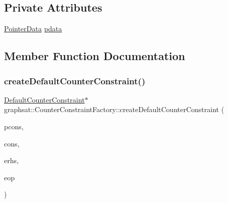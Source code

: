 \subsection*{Private Attributes}
\begin{DoxyCompactItemize}
\item 
\mbox{\hyperlink{classgraphsat_1_1_pointer_data}{Pointer\+Data}} \mbox{\hyperlink{classgraphsat_1_1_counter_constraint_factory_a228041246730a92798c374c31515e478}{pdata}}
\end{DoxyCompactItemize}


\subsection{Member Function Documentation}
\mbox{\label{classgraphsat_1_1_counter_constraint_factory_ab9159fe75e5f66be295919d7e4e8424c}} 
\subsubsection{\texorpdfstring{createDefaultCounterConstraint()}{createDefaultCounterConstraint()}}
{\footnotesize\ttfamily \mbox{\hyperlink{classgraphsat_1_1_default_counter_constraint}{Default\+Counter\+Constraint}}$\ast$ graphsat\+::\+Counter\+Constraint\+Factory\+::create\+Default\+Counter\+Constraint (\begin{DoxyParamCaption}\item[{const vector$<$ pair$<$ int, int $>$$>$ \&}]{pcons,  }\item[{const vector$<$ pair$<$ int, int $>$$>$ \&}]{cons,  }\item[{int}]{erhs,  }\item[{\mbox{\hyperlink{namespacegraphsat_acfb5939f9bdafbd9aea0d084b9a56f69}{C\+O\+M\+P\+\_\+\+O\+P\+E\+R\+A\+T\+OR}}}]{eop }\end{DoxyParamCaption})\hspace{0.3cm}{\ttfamily [inline]}}

